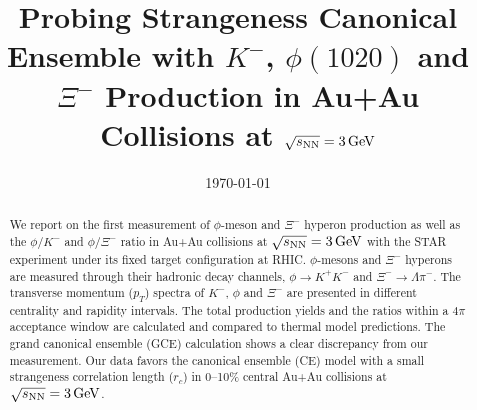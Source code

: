 \documentclass[%
 reprint,	
showpacs,
 amsmath,amssymb,
 aps,
 prc,
]{revtex4-1}
\begin{document}

\title{Probing Strangeness Canonical Ensemble with $K^{-}$, $\phi(1020)$ and $\Xi^{-}$ Production in Au+Au Collisions at ${\sqrt{s_{\rm NN}} = \rm{3\,GeV}}$}%


\noaffiliation

\date{\today}%

\begin{abstract}


We report on the first measurement of $\phi$-meson and $\Xi^{-}$ hyperon production as well as the $\phi/K^-$ and $\phi/\Xi^-$ ratio in Au+Au collisions at ${\sqrt{s_{\rm NN}} = \rm{3\,GeV}}$ with the STAR experiment under its fixed target configuration at RHIC. $\phi$-mesons and $\Xi^{-}$ hyperons are measured through their hadronic decay channels, $\phi\rightarrow K^+K^-$ and $\Xi^-\rightarrow \Lambda\pi^-$. The transverse momentum ($p_T$) spectra of $K^-$, $\phi$ and $\Xi^{-}$ are presented in different centrality and rapidity intervals. The total production yields and the ratios within a $4\pi$ acceptance window are calculated and compared to thermal model predictions. The grand canonical ensemble (GCE) calculation shows a clear discrepancy from our measurement. Our data favors the canonical ensemble (CE) model with a small strangeness correlation length ($r_c$) in 0--10\% central Au+Au collisions at ${\sqrt{s_{\rm NN}} = \rm{3\,GeV}}$.


\end{abstract}
\end{document}
